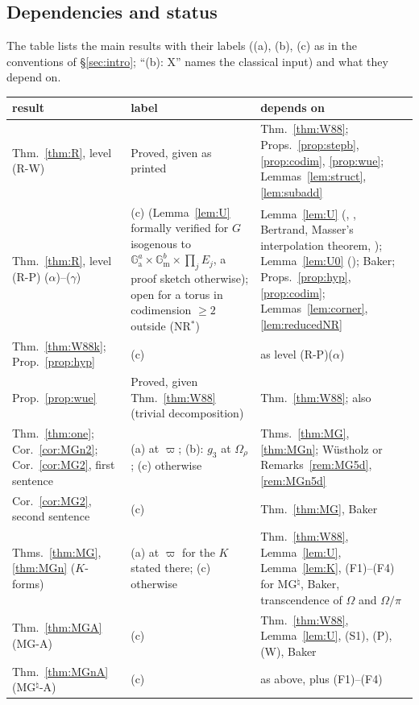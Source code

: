 \documentclass[11pt]{amsart}
\theoremstyle{definition}
\newcommand{\Ga}{\mathbb{G}_{\mathrm a}}
\newcommand{\Gm}{\mathbb{G}_{\mathrm m}}
\newcommand{\vp}{\varpi}
\newif\ifformallabels \formallabelstrue
\newcommand{\TierA}{\ifformallabels(a)\else(c)\fi}
\newcommand{\TierB}{\ifformallabels(b)\else(c)\fi}
\begin{document}
\subsection{Dependencies and status}\label{sec:deps}
The table lists the main results with their labels ((a), (b), (c) as in the conventions of \S\ref{sec:intro}; ``(b): X''
names the classical input) and what they depend on.
{\small
\begin{longtable}{>{\raggedright\arraybackslash}p{3.3cm}>{\raggedright\arraybackslash}p{4.4cm}>{\raggedright\arraybackslash}p{6.2cm}}
result & label & depends on\\\hline
\endhead
Thm.~\ref{thm:R}, level (R-W) & Proved, given \cite[Thm.~4.1]{W88} as printed & Thm.~\ref{thm:W88}; Props.~\ref{prop:stepb}, \ref{prop:codim}, \ref{prop:wue}; Lemmas~\ref{lem:struct}, \ref{lem:subadd}\\
Thm.~\ref{thm:R}, level (R-P) ($\alpha$)--($\gamma$) & (c) (Lemma~\ref{lem:U} formally verified for $G$ isogenous to $\Ga^a\times\Gm^b\times\prod_jE_j$, a proof sketch otherwise); open for a torus in codimension $\ge2$ outside (NR$^*$) & Lemma~\ref{lem:U} (\cite{W83}, \cite{Se79}, Bertrand, Masser's interpolation theorem, \cite{Ph86}); Lemma~\ref{lem:U0} (\cite[Thm.~11.21]{W00}); Baker; Props.~\ref{prop:hyp}, \ref{prop:codim}; Lemmas~\ref{lem:corner}, \ref{lem:reducedNR}\\
Thm.~\ref{thm:W88k}; Prop.~\ref{prop:hyp} & (c) & as level (R-P)($\alpha$)\\
Prop.~\ref{prop:wue} & Proved, given Thm.~\ref{thm:W88} (trivial decomposition) & Thm.~\ref{thm:W88}; also \cite{Wu89}\\
Thm.~\ref{thm:one}; Cor.~\ref{cor:MGn2}; Cor.~\ref{cor:MG2}, first sentence & \TierA{} at $\vp$; \TierB: $g_3$ at $\Omega_\rho$; (c) otherwise & Thms.~\ref{thm:MG}, \ref{thm:MGn}; W\"ustholz or Remarks~\ref{rem:MG5d}, \ref{rem:MGn5d}\\
Cor.~\ref{cor:MG2}, second sentence & (c) & Thm.~\ref{thm:MG}, Baker\\
Thms.~\ref{thm:MG}, \ref{thm:MGn} ($K$-forms) & \TierA{} at $\vp$ for the $K$ stated there; (c) otherwise & Thm.~\ref{thm:W88}, Lemma~\ref{lem:U}, Lemma~\ref{lem:K}, (F1)--(F4) for MG$^\natural$, Baker, transcendence of $\Omega$ and $\Omega/\pi$\\
Thm.~\ref{thm:MGA} (MG-A) & (c) & Thm.~\ref{thm:W88}, Lemma~\ref{lem:U}, (S1), (P), (W), Baker\\
Thm.~\ref{thm:MGnA} (MG$^\natural$-A) & (c) & as above, plus (F1)--(F4)\\

\end{longtable}}
\end{document}
